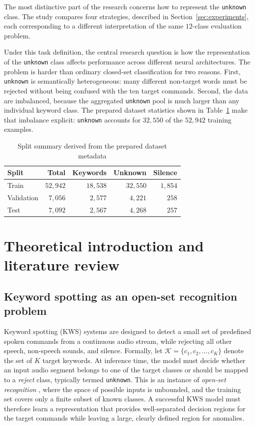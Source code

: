 \documentclass[11pt]{article}
\begin{document}
The most distinctive part of the research concerns how to represent the \texttt{unknown} class. The study compares four strategies, described in Section~\ref{sec:experiments}, each corresponding to a different interpretation of the same \(12\)-class evaluation problem.

Under this task definition, the central research question is how the representation of the \texttt{unknown} class affects performance across different neural architectures. The problem is harder than ordinary closed-set classification for two reasons. First, \texttt{unknown} is semantically heterogeneous: many different non-target words must be rejected without being confused with the ten target commands. Second, the data are imbalanced, because the aggregated \texttt{unknown} pool is much larger than any individual keyword class. The prepared dataset statistics shown in Table~\ref{tab:split-summary} make that imbalance explicit: \texttt{unknown} accounts for \(32{,}550\) of the \(52{,}942\) training examples.

\begin{table}[t!]
\centering
\caption{Split summary derived from the prepared dataset metadata}
\label{tab:split-summary}
\smallskip
\small
\begin{tabular}{@{}lrrrr@{}}
\toprule
\textbf{Split} & \textbf{Total} & \textbf{Keywords} & \textbf{Unknown} & \textbf{Silence}\\
\midrule
Train & \(52{,}942\) & \(18{,}538\) & \(32{,}550\) & \(1{,}854\) \\
Validation & \(7{,}056\) & \(2{,}577\) & \(4{,}221\) & \(258\) \\
Test & \(7{,}092\) & \(2{,}567\) & \(4{,}268\) & \(257\) \\
\bottomrule
\end{tabular}
\end{table}

\section{Theoretical introduction and literature review}
\label{sec:theory}

\subsection{Keyword spotting as an open-set recognition problem}
Keyword spotting (KWS) systems are designed to detect a small set of predefined spoken commands from a continuous audio stream, while rejecting all other speech, non-speech sounds, and silence. 
Formally, let $\mathcal{K} = \{c_1, c_2, \dots, c_K\}$ denote the set of $K$ target keywords. 
At inference time, the model must decide whether an input audio segment belongs to one of the target classes or should be mapped to a \emph{reject} class, typically termed \texttt{unknown}. 
This is an instance of \emph{open-set recognition} \cite{openmax}, where the space of possible inputs is unbounded, and the training set covers only a finite subset of known classes. 
A successful KWS model must therefore learn a representation that provides well-separated decision regions for the target commands while leaving a large, clearly defined region for anomalies.
\end{document}
